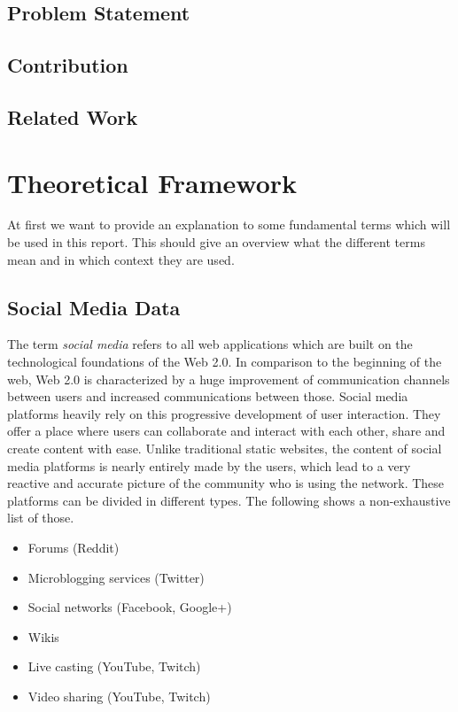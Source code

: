 \documentclass[11pt,titlepage,oneside,openany]{book}
\begin{document}
 
\section{Problem Statement}
 

\section{Contribution}


\section{Related Work}



\chapter{Theoretical Framework}
\label{cha:theory}

At first we want to provide an explanation to some fundamental terms which will be used in this report. This should give an overview what the different terms mean and in which context they are used.

\section{Social Media Data}
\label{sec:socmedia}

The term \textit{social media} refers to all web applications which are built on the technological foundations of the Web 2.0. In comparison to the beginning of the web, Web 2.0 is characterized by a huge improvement of communication channels between users and increased communications between those. Social media platforms heavily rely on this progressive development of user interaction. They offer a place where users can collaborate and interact with each other, share and create content with ease. Unlike traditional static websites, the content of social media platforms is nearly entirely made by the users, which lead to a very reactive and accurate picture of the community who is using the network. These platforms can be divided in different types. The following shows a non-exhaustive list of those. \cite{Rouse2016-09-15}\cite{Rouse2015-01-15}

\begin{itemize}
	\item Forums (Reddit)
	\item Microblogging services (Twitter)
	\item Social networks (Facebook, Google+)
	\item Wikis
	\item Live casting (YouTube, Twitch)\\
	\item Video sharing (YouTube, Twitch)
\end{itemize}
\end{document}
